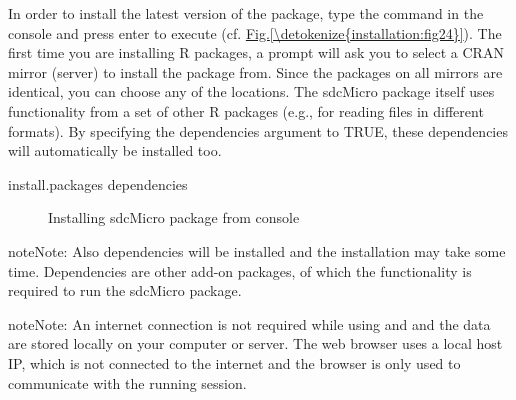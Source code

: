 \documentclass[letterpaper,10pt,english]{sphinxmanual}
\begin{document}
In order to install the latest version of the  package, type the command
 in the console and press enter to execute (cf. \hyperref[\detokenize{installation:fig24}]{Fig.\@ \ref{\detokenize{installation:fig24}}}).
The first time you are installing R packages, a prompt will ask you to select a CRAN mirror (server) to install the package from.
Since the packages on all mirrors are identical, you can choose any of the locations.
The sdcMicro package itself uses functionality
from a set of other R packages (e.g.,  for reading files in different formats).
By specifying the dependencies argument to TRUE, these dependencies will automatically be installed too.

\def\sphinxLiteralBlockLabel{\label{\detokenize{installation:code01}}}
%
\begin{sphinxVerbatim}[commandchars=\\\{\},numbers=left,firstnumber=1,stepnumber=1]
install.packages dependencies  
\end{sphinxVerbatim}

\begin{figure}[htbp]
\centering
\capstart

\noindent{}
\caption{Installing sdcMicro package from  console}\label{\detokenize{installation:fig24}}\label{\detokenize{installation:id13}}\end{figure}

\begin{sphinxadmonition}{note}{Note:}
Also dependencies will be installed and the installation may take some time.
Dependencies are other add-on packages, of which the functionality is required to run the sdcMicro package.
\end{sphinxadmonition}

\begin{sphinxadmonition}{note}{Note:}
An internet connection is not required while using  and  and the data
are stored locally on your computer or server. The web browser uses a local host IP,
which is not connected to the internet and the browser is only used to communicate with
the running  session.
\end{sphinxadmonition}
\end{document}
